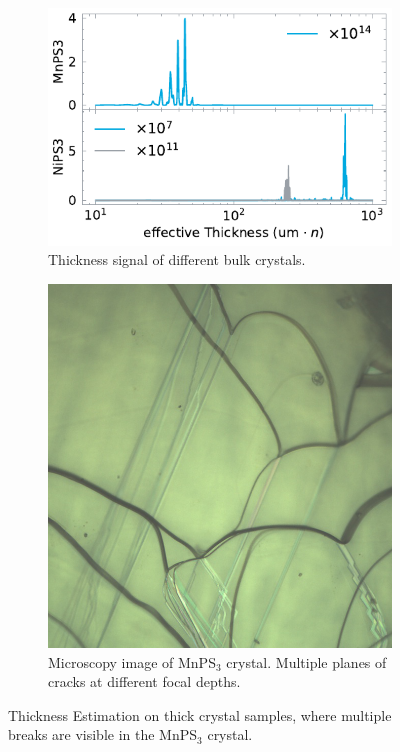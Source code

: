\documentclass[
	oneside,
	parskip=half,
	a4paper,
]{scrbook}
\begin{document}
\begin{figure}
	\begin{subfigure}[t]{3.5in}
		\vskip 0pt
		\centering
		\includegraphics{../figures/2024-03-14 thickness.pdf}
		\caption{Thickness signal of different bulk crystals.}
		\label{fig:thickness bulk}
	\end{subfigure}
	\begin{subfigure}[t]{.3\textwidth}
		\vskip 4pt
		\centering
		\includegraphics[width=\textwidth]{../../data/2023-11-02/i001_MnPS3_50x_a.png}
		\caption{Microscopy image of MnPS$_3$ crystal. Multiple planes of cracks at different focal depths.}
		\label{fig:thickness MnPS3}
	\end{subfigure}
	\caption{Thickness Estimation on thick crystal samples, where multiple breaks are visible in the MnPS$_3$ crystal.} 
\end{figure}
\end{document}
